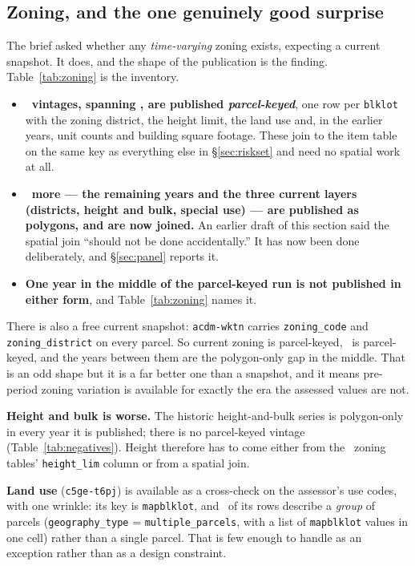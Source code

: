 \documentclass[11pt]{article}
\begin{document}
\subsection{Zoning, and the one genuinely good surprise}

The brief asked whether any \emph{time-varying} zoning exists, expecting a current snapshot.
It does, and the shape of the publication is the finding. Table~\ref{tab:zoning} is the
inventory.

\begin{itemize}
\item \textbf{\acqZoningParcelYears\ vintages, spanning \acqZoningParcelSpan, are published
\emph{parcel-keyed}}, one row per \texttt{blklot} with the zoning district, the height limit,
the land use and, in the earlier years, unit counts and building square footage. These join to
the item table on the same key as everything else in \S\ref{sec:riskset} and need no spatial
work at all.
\item \textbf{\acqZoningPolygonYears\ more --- the remaining years and the three current
layers (districts, height and bulk, special use) --- are published as polygons, and are now
joined.} An earlier draft of this section said the spatial join ``should not be done
accidentally.'' It has now been done deliberately, and \S\ref{sec:panel} reports it.
\item \textbf{One year in the middle of the parcel-keyed run is not published in either
form}, and Table~\ref{tab:zoning} names it.
\end{itemize}

There is also a free current snapshot: \texttt{acdm-wktn} carries \texttt{zoning\_code} and
\texttt{zoning\_district} on every parcel. So current zoning is parcel-keyed,
\acqZoningParcelSpan\ is parcel-keyed, and the years between them are the polygon-only gap in
the middle. That is an odd shape but
it is a far better one than a snapshot, and it means pre-period zoning variation is
available for exactly the era the assessed values are not.

\textbf{Height and bulk is worse.} The historic height-and-bulk series is polygon-only in
every year it is published; there is no parcel-keyed vintage (Table~\ref{tab:negatives}).
Height therefore has to come either from the \acqZoningParcelSpan\ zoning tables'
\texttt{height\_lim} column or from a spatial join.

\textbf{Land use} (\texttt{c5ge-t6pj}) is available as a cross-check on the assessor's use
codes, with one wrinkle: its key is \texttt{mapblklot}, and \acqLandUseMulti\ of its rows
describe a \emph{group} of parcels (\texttt{geography\_type} = \texttt{multiple\_parcels},
with a list of \texttt{mapblklot} values in one cell) rather than a single parcel. That is few
enough to handle as an exception rather than as a design constraint.
\end{document}
